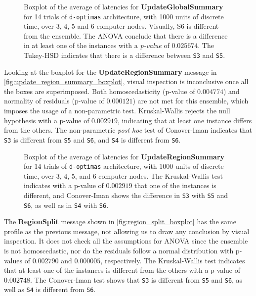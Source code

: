 \documentclass[preprint,12pt]{elsarticle}
\begin{document}
\begin{figure}[ht!]
    \centering
    
    \caption{Boxplot of the average of latencies for \textbf{UpdateGlobalSummary} for 14 trials of \texttt{d-optimas} architecture, with 1000 units of discrete time, over 3, 4, 5 and 6 computer nodes. Visually, S6 is different from the ensemble. The ANOVA conclude that there is a difference in at least one of the instances with a \textit{p-value} of $0.025674$. The Tukey-HSD indicates that there is a difference between \texttt{S3} and \texttt{S5}.}
    \label{fig:update_global_summary_boxplot}
\end{figure}

Looking at the boxplot for the \textbf{UpdateRegionSummary} message in \autoref{fig:update_region_summary_boxplot}, visual inspection is inconclusive once all the boxes are superimposed. Both homoscedasticity (p-value of $0.004774$) and normality of residuals (p-value of $0.000121$) are not met for this ensemble, which imposes the usage of a non-parametric test. Kruskal-Wallis rejects the null hypothesis with a p-value of $0.002919$, indicating that at least one instance differs from the others. The non-parametric \textit{post hoc} test of Conover-Iman indicates that \texttt{S3} is different from \texttt{S5} and \texttt{S6}, and \texttt{S4} is different from \texttt{S6}.

\begin{figure}[ht!]
    \centering
    
    \caption{Boxplot of the average of latencies for \textbf{UpdateRegionSummary} for 14 trials of \texttt{d-optimas} architecture, with 1000 units of discrete time, over 3, 4, 5, and 6 computer nodes. The Kruskal-Wallis test indicates with a p-value of $0.002919$ that one of the instances is different, and Conover-Iman shows the difference in \texttt{S3} with \texttt{S5} and \texttt{S6}, as well as in \texttt{S4} with \texttt{S6}.}
    \label{fig:update_region_summary_boxplot}
\end{figure}

The \textbf{RegionSplit} message shown in \autoref{fig:region_split_boxplot} has the same profile as the previous message, not allowing us to draw any conclusion by visual inspection. It does not check all the assumptions for ANOVA since the ensemble is not homoscedastic, nor do the residuals follow a normal distribution with p-values of $0.002790$ and $0.000005$, respectively. The Kruskal-Wallis test indicates that at least one of the instances is different from the others with a p-value of $0.002748$. The Conover-Iman test shows that \texttt{S3} is different from \texttt{S5} and \texttt{S6}, as well as \texttt{S4} is different from \texttt{S6}. 
\end{document}

